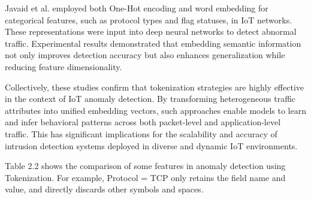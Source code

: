 \begin{ZhChapter}
    Javaid et al. \cite{javaid2016deep} employed both One-Hot encoding and word embedding for categorical features, such as protocol types and flag statuses, in IoT networks. These representations were input into deep neural networks to detect abnormal traffic. Experimental results demonstrated that embedding semantic information not only improves detection accuracy but also enhances generalization while reducing feature dimensionality.

    Collectively, these studies confirm that tokenization strategies are highly effective in the context of IoT anomaly detection. By transforming heterogeneous traffic attributes into unified embedding vectors, such approaches enable models to learn and infer behavioral patterns across both packet-level and application-level traffic. This has significant implications for the scalability and accuracy of intrusion detection systems deployed in diverse and dynamic IoT environments.



    Table 2.2 shows the comparison of some features in anomaly detection using Tokenization. For example, Protocol = TCP only retains the field name and value, and directly discards other symbols and spaces.


\end{ZhChapter}
